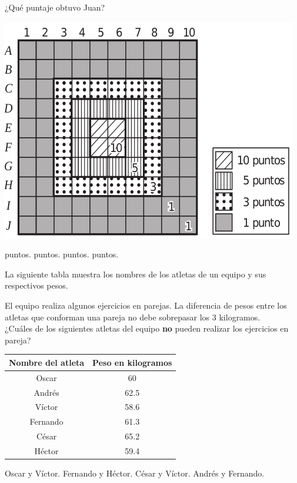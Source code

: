 \documentclass[10pt,letterpaper,addpoints]{exam}
\begin{document}
\begin{questions}
\begin{minipage}{.35\textwidth}
¿Qué puntaje obtuvo Juan?
\end{minipage}\hfill
\begin{minipage}{.65\textwidth}
\begin{center}
\includegraphics[scale=.55]{Images/juego_dados.png} 
\end{center}
\end{minipage}

\begin{oneparchoices}
 puntos.
 puntos.
 puntos.
 puntos.
\end{oneparchoices}

\begin{minipage}{.5\textwidth}
\question 
La siguiente tabla muestra los nombres de los atletas de un equipo y sus respectivos pesos.

El equipo realiza algunos ejercicios en parejas. La diferencia de pesos entre los atletas que conforman una pareja no debe sobrepasar los 3 kilogramos.\\

¿Cuáles de los siguientes atletas del equipo \textbf{no} pueden realizar los ejercicios en pareja?
\end{minipage}\hfill
\begin{minipage}{.5\textwidth}
\begin{tabular}{|c|c|}
\hline 
\textbf{Nombre del atleta} & \textbf{Peso en kilogramos} \\ 
\hline 
Oscar & 60 \\ 
\hline 
Andrés & 62.5 \\ 
\hline 
Víctor & 58.6 \\ 
\hline 
Fernando & 61.3 \\ 
\hline 
César & 65.2 \\ 
\hline 
Héctor & 59.4 \\ 
\hline 
\end{tabular} 
\end{minipage}

\begin{oneparchoices}
\choice Oscar y Víctor.
\choice Fernando y Héctor.
\CorrectChoice César y Víctor.
\choice Andrés y Fernando.
\end{oneparchoices}
\end{questions}
\end{document}
